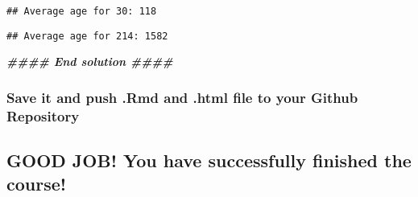 \documentclass[
]{article}
\newenvironment{Shaded}{\begin{snugshade}}{\end{snugshade}}
\newcommand{\AttributeTok}[1]{\textcolor[rgb]{0.77,0.63,0.00}{#1}}
\newcommand{\CommentTok}[1]{\textcolor[rgb]{0.56,0.35,0.01}{\textit{#1}}}
\newcommand{\DocumentationTok}[1]{\textcolor[rgb]{0.56,0.35,0.01}{\textbf{\textit{#1}}}}
\newcommand{\FunctionTok}[1]{\textcolor[rgb]{0.00,0.00,0.00}{#1}}
\newcommand{\NormalTok}[1]{#1}
\newcommand{\OtherTok}[1]{\textcolor[rgb]{0.56,0.35,0.01}{#1}}
\newcommand{\SpecialCharTok}[1]{\textcolor[rgb]{0.00,0.00,0.00}{#1}}
\newcommand{\StringTok}[1]{\textcolor[rgb]{0.31,0.60,0.02}{#1}}
\begin{document}
\begin{verbatim}
## Average age for 30: 118
\end{verbatim}

\begin{Shaded}
\end{Shaded}

\begin{verbatim}
## Average age for 214: 1582
\end{verbatim}

\begin{Shaded}
\begin{Highlighting}[]
\DocumentationTok{\#\#\#\# End solution \#\#\#\#}
\end{Highlighting}
\end{Shaded}

\hypertarget{save-it-and-push-.rmd-and-.html-file-to-your-github-repository}{%
\subsubsection{Save it and push .Rmd and .html file to your Github
Repository}\label{save-it-and-push-.rmd-and-.html-file-to-your-github-repository}}

\hypertarget{good-job-you-have-successfully-finished-the-course}{%
\subsection{GOOD JOB! You have successfully finished the
course!}\label{good-job-you-have-successfully-finished-the-course}}
\end{document}
